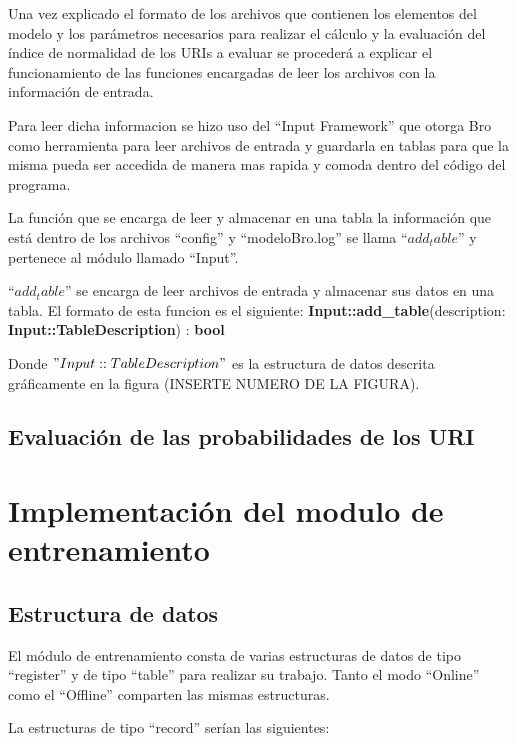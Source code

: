 Una vez explicado el formato de los archivos que contienen los elementos del modelo y los parámetros necesarios para realizar el cálculo y la evaluación del índice de normalidad de los URIs a evaluar se procederá a explicar el funcionamiento de las funciones encargadas de leer los archivos con la información de entrada.

Para leer dicha informacion se hizo uso del  “Input Framework” que otorga Bro como herramienta para leer archivos de entrada y guardarla en tablas para que la misma pueda ser accedida de manera mas rapida y comoda dentro del código del programa. 

La función que se encarga de leer y almacenar en una tabla la información que está dentro de los archivos “config” y “modeloBro.log”  se llama $“add_table”$ y pertenece al módulo llamado “Input”.

$“add_table”$ se encarga de leer archivos de entrada y almacenar sus datos
en una tabla. El formato de esta funcion es el siguiente:
%
\textbf{Input::add\_table}(description: \textbf{Input::TableDescription}) : \textbf{bool} 

Donde $"Input::TableDescription"$ es la  estructura de datos descrita gráficamente en la figura (INSERTE NUMERO DE LA FIGURA).


\subsection{Evaluación de las probabilidades de los URI}


\section{Implementación del modulo de entrenamiento}

\subsection{Estructura de datos}\label{sub:estructuraEntrenamiento}
El módulo de entrenamiento consta de varias estructuras de datos de tipo “register” y de tipo “table” para realizar su trabajo. Tanto el modo “Online” como el “Offline” comparten las mismas estructuras.

La estructuras de tipo “record” serían las siguientes:

